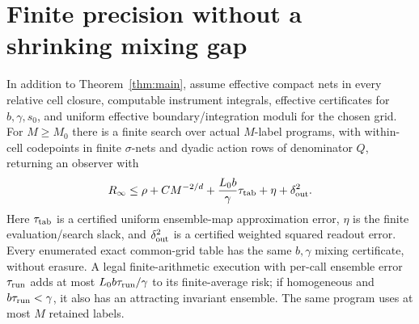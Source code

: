 \section{Finite precision without a shrinking mixing gap}\label{sec:compilation}
\begin{proposition}\label{prop:compilation}
In addition to Theorem~\ref{thm:main}, assume effective compact nets in every relative cell closure, computable instrument integrals, effective certificates for $b,\gamma,s_0$, and uniform effective boundary/integration moduli for the chosen grid. For $M\ge M_0$ there is a finite search over actual $M$-label programs, with within-cell codepoints in finite $\sigma$-nets and dyadic action rows of denominator $Q$, returning an observer with
\begin{equation}\label{eq:compiled}
 R_\infty\le\rho+CM^{-2/d}
       +\frac{L_0b}{\gamma}\tau_{\rm tab}
       +\eta+\delta_{\rm out}^2.
\end{equation}
Here $\tau_{\rm tab}$ is a certified uniform ensemble-map approximation error, $\eta$ is the finite evaluation/search slack, and $\delta_{\rm out}^2$ is a certified weighted squared readout error. Every enumerated exact common-grid table has the same $b,\gamma$ mixing certificate, without erasure. A legal finite-arithmetic execution with per-call ensemble error $\tau_{\rm run}$ adds at most $L_0b\tau_{\rm run}/\gamma$ to its finite-average risk; if homogeneous and $b\tau_{\rm run}<\gamma$, it also has an attracting invariant ensemble. The same program uses at most $M$ retained labels.
\end{proposition}
